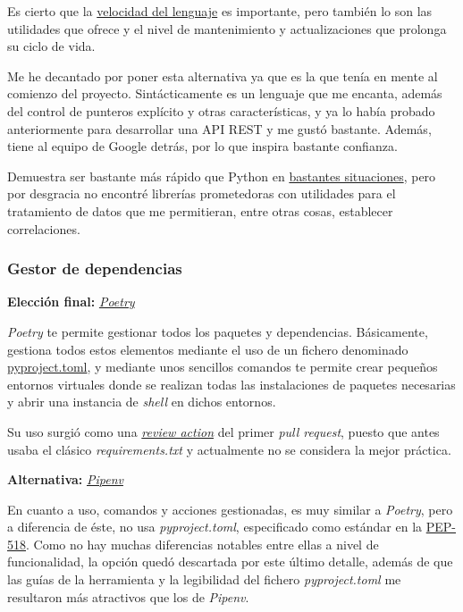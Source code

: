 Es cierto que la \href{https://benchmarksgame-team.pages.debian.net/benchmarksgame/index.html}{velocidad del lenguaje} es importante, pero también lo son las utilidades que ofrece y el nivel de mantenimiento y actualizaciones que prolonga su ciclo de vida.

Me he decantado por poner esta alternativa ya que es la que tenía en mente al comienzo del proyecto. Sintácticamente es un lenguaje que me encanta, además del control de punteros explícito y otras características, y ya lo había probado anteriormente para desarrollar una API REST y me gustó bastante. Además, tiene al equipo de Google detrás, por lo que inspira bastante confianza.

Demuestra ser bastante más rápido que Python en \href{https://benchmarksgame-team.pages.debian.net/benchmarksgame/fastest/go-python3.html}{bastantes situaciones}, pero por desgracia no encontré librerías prometedoras con utilidades para el tratamiento de datos que me permitieran, entre otras cosas, establecer correlaciones.

\subsubsection{Gestor de dependencias}

\textbf{Elección final:} \href{https://python-poetry.org/}{\textit{Poetry}}

\textit{Poetry} te permite gestionar todos los paquetes y dependencias. Básicamente, gestiona todos estos elementos mediante el uso de un fichero denominado \href{https://github.com/Anglepi/My-Many-Reads/blob/main/pyproject.toml}{pyproject.toml}, y mediante unos sencillos comandos te permite crear pequeños entornos virtuales donde se realizan todas las instalaciones de paquetes necesarias y abrir una instancia de \textit{shell} en dichos entornos.

Su uso surgió como una \href{https://github.com/Anglepi/My-Many-Reads/pull/39#discussion_r974230463}{\textit{review action}} del primer \textit{pull request}, puesto que antes usaba el clásico \textit{requirements.txt} y actualmente no se considera la mejor práctica.

\textbf{Alternativa:} \href{https://pipenv-es.readthedocs.io/es/latest/}{\textit{Pipenv}}

En cuanto a uso, comandos y acciones gestionadas, es muy similar a \textit{Poetry}, pero a diferencia de éste, no usa \textit{pyproject.toml}, especificado como estándar en la \href{https://peps.python.org/pep-0518/}{PEP-518}. Como no hay muchas diferencias notables entre ellas a nivel de funcionalidad, la opción quedó descartada por este último detalle, además de que las guías de la herramienta y la legibilidad del fichero \textit{pyproject.toml} me resultaron más atractivos que los de \textit{Pipenv}.

